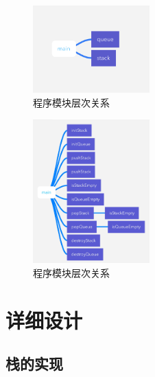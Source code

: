 \documentclass{article}
\begin{document}
\begin{figure}[htbp]
    
    \centering\includegraphics[width=0.4\textwidth]{./Images/pic2_2_1.png}
    
    \caption{程序模块层次关系}
    
\end{figure}

\begin{figure}[htbp]
    
    \centering\includegraphics[width=0.4\textwidth]{./Images/pic2_2_2.png}
    
    \caption{程序模块层次关系}
    
\end{figure}

\section{详细设计}

\subsection{栈的实现}
\end{document}
